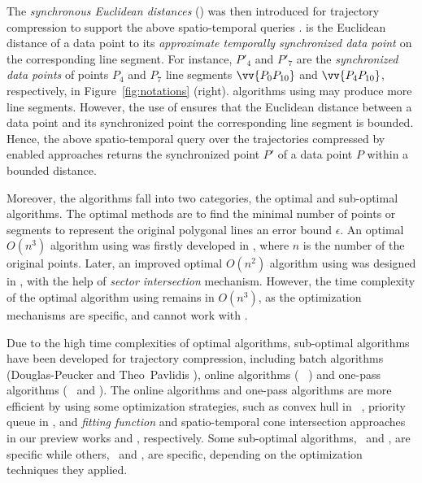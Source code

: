 The \emph{synchronous Euclidean distances} (\sed) was then introduced for trajectory compression to support the above spatio-temporal queries \cite{Meratnia:Spatiotemporal}. \sed is the Euclidean distance of a data point to its \emph{approximate temporally synchronized data point \cite{Meratnia:Spatiotemporal}} on the corresponding line segment. For instance, $P'_4$ and $P'_7$ are the \emph{synchronized data points} of points $P_4$ and $P_7$ \wrt line segments $\vv{P_0P_{10}}$ and $\vv{P_4P_{10}}$, respectively, in Figure~\ref{fig:notations} (right).
\lsa algorithms using \sed may produce more line segments. However, the use of \sed ensures that the Euclidean distance between a data point and its  synchronized point \wrt the corresponding line segment is bounded. Hence, the above spatio-temporal query over the trajectories compressed by \sed enabled approaches returns the synchronized point $P'$ of a data point $P$ within a bounded distance.

Moreover, the \lsa algorithms fall into two categories, \ie the optimal and sub-optimal algorithms. %
The optimal methods are to find the minimal number of points or segments to represent the original polygonal lines \wrt an error bound $\epsilon$.
An optimal $O(n^3)$ \lsa algorithm using \ped was firstly developed in \cite{Imai:Optimal},  where $n$ is the number of the original points.
%
Later, an improved optimal  $O(n^2)$  algorithm using \ped was designed in \cite{Chan:Optimal}, with the help of \textit{sector intersection} mechanism.
However, the time complexity of the optimal \lsa algorithm using \sed remains in $O(n^3)$, as the optimization mechanisms are \ped specific, and cannot work with \sed.

Due to the high time complexities of optimal \lsa algorithms, sub-optimal \lsa algorithms have been developed for trajectory compression, including batch algorithms (\eg Douglas-Peucker \cite{Douglas:Peucker, Meratnia:Spatiotemporal} and Theo~Pavlidis \cite{Pavlidis:Segment}), online algorithms (\eg~\bqsa\cite{Liu:BQS} \squishe \cite{Muckell:Compression}) and one-pass algorithms (\eg~\operb \cite{Lin:Operb} and \cised \cite{Lin:Cised}). The online algorithms and one-pass algorithms are more efficient by using some optimization strategies, such as convex hull in \bqsa~\cite{Liu:BQS}, priority queue in \squishe \cite{Muckell:Compression}, and \textit{fitting function} and spatio-temporal cone intersection approaches in our preview works \operb \cite {Lin:Operb} and \cised \cite {Lin:Cised}, respectively. Some sub-optimal algorithms, \eg ~\bqsa and \operb, are \ped specific while others, \eg~\squishe and \cised, are \sed specific, depending on the optimization techniques they applied.


